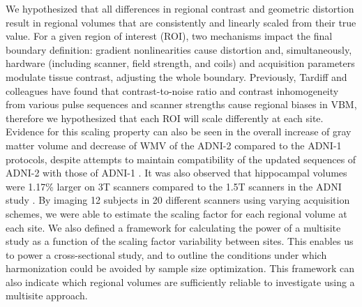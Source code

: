 We hypothesized that all differences in regional contrast and geometric distortion result in regional volumes that are consistently and linearly scaled from their true value. For a given region of interest (ROI), two mechanisms impact the final boundary definition: gradient nonlinearities cause distortion and, simultaneously, hardware  (including scanner, field strength, and coils) and acquisition parameters modulate tissue contrast, adjusting the whole boundary. Previously, Tardiff and colleagues have found that contrast-to-noise ratio and contrast inhomogeneity from various pulse sequences and scanner strengths cause regional biases in VBM\cite{tardif2010regional, tardif2009sensitivity}, therefore we hypothesized that each ROI will scale differently at each site. Evidence for this scaling property can also be seen in the overall increase of gray matter volume and decrease of WMV of the ADNI-2 compared to the ADNI-1 protocols, despite attempts to maintain compatibility of the updated sequences of ADNI-2 with those of ADNI-1 \cite{Brunton_2013}. It was also observed that hippocampal volumes were 1.17\% larger on 3T scanners compared to the 1.5T scanners in the ADNI study \cite{Wolz_2014}. By imaging 12 subjects in 20 different scanners using varying acquisition schemes, we were able to estimate the scaling factor for each regional volume at each site. We also defined a framework for calculating the power of a multisite study as a function of the scaling factor variability between sites. This enables us to power a cross-sectional study, and to outline the conditions under which harmonization could be avoided by sample size optimization. This framework can also indicate which regional volumes are sufficiently reliable to investigate using a multisite approach.
